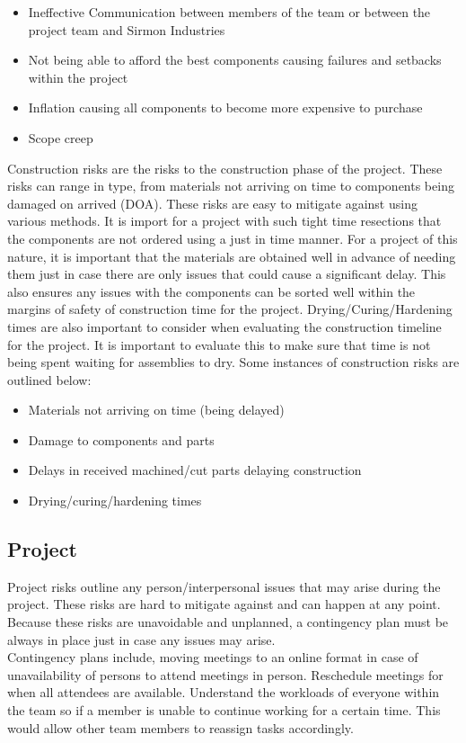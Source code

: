 \documentclass [12pt]{article}
\begin{document}
\begin{itemize}
    \item Ineffective Communication between members of the team or between the project team and Sirmon Industries
    \item Not being able to afford the best components causing failures and setbacks within the project
    \item Inflation causing all components to become more expensive to purchase
    \item Scope creep
\end{itemize}

Construction risks are the risks to the construction phase of the project. These risks can range in type, from materials not arriving on time to components being damaged on arrived (DOA). These risks are easy to mitigate against using various methods. It is import for a project with such tight time resections that the components are not ordered using a just in time \cite{Just-In-Time_Manufacturing} manner. For a project of this nature, it is important that the materials are obtained well in advance of needing them just in case there are only issues that could cause a significant delay. This also ensures any issues with the components can be sorted well within the margins of safety of construction time for the project. 
Drying/Curing/Hardening times are also important to consider when evaluating the construction timeline for the project. It is important to evaluate this to make sure that time is not being spent waiting for assemblies to dry.
Some instances of construction risks are outlined below:

\begin{itemize}
    \item Materials not arriving on time (being delayed)
    \item Damage to components and parts
    \item Delays in received machined/cut parts delaying construction
    \item Drying/curing/hardening times
\end{itemize}

\subsection{Project}\label{sec:Projcet_Risk}

Project risks outline any person/interpersonal issues that may arise during the project. These risks are hard to mitigate against and can happen at any point. Because these risks are unavoidable and unplanned, a contingency plan must be always in place just in case any issues may arise. 
\\
Contingency plans include, moving meetings to an online format in case of unavailability of persons to attend meetings in person. Reschedule meetings for when all attendees are available. Understand the workloads of everyone within the team so if a member is unable to continue working for a certain time. This would allow other team members to reassign tasks accordingly.
\end{document}
